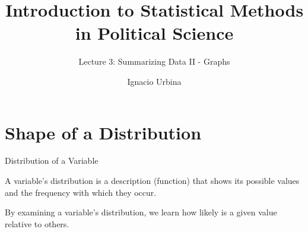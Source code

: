 \documentclass[handout]{beamer} %
\title{Introduction to Statistical Methods in Political Science}
\subtitle{Lecture 3: Summarizing Data II - Graphs}
\author{Ignacio Urbina}
\date{}
\begin{document}
\begin{frame}
    \titlepage
\end{frame}

\section{Shape of a Distribution}

\begin{frame}{Distribution of a Variable}

A variable's distribution is a description (function) that shows its possible values and the frequency with which they occur.

By examining a variable's distribution, we learn how likely is a given value relative to others.

\end{frame}
\end{document}
